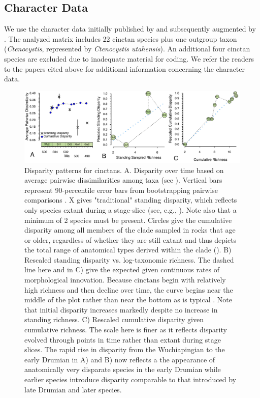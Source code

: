 \documentclass{article}
\begin{document}
\subsection{Character Data}
We use the character data initially published by \citep{SmithZamora2009} and subsequently augmented by \citep{ZamoraRahmanSmith2013}.  The analyzed matrix includes 22 cinctan species plus one outgroup taxon (\textit{Ctenocystis}, represented by \textit{Ctenocystis utahensis}). An additional four cinctan species are excluded due to inadequate material for coding.  We refer the readers to the papers cited above for additional information concerning the character data.
\begin{figure}
  \includegraphics[width=\textwidth]{figures/Cinctan Disparity 3Ways Horizontal.pdf}

  \caption{Disparity patterns for cinctans.  A. Disparity over time based on average pairwise dissimilarities among taxa (see \cite{Foote1992}).  Vertical bars represent 90-percentile error bars from bootstrapping pairwise comparisons \citep{Foote1993}.  X gives "traditional" standing disparity, which reflects only species extant during a stage-slice (see, e.g., \citep{Hughes2013}).  Note also that a minimum of 2 species must be present. Circles give the cumulative disparity among all members of the clade sampled in rocks that age or older, regardless of whether they are still extant and thus depicts the total range of anatomical types derived within the clade (\citep{Wagner2015}).  B) Rescaled standing disparity vs. log-taxonomic richness. The dashed line here and in C) give the expected given continuous rates of morphological innovation.  Because cinctans begin with relatively high richness and then decline over time, the curve begins near the middle of the plot rather than near the bottom as is typical \citep{Jablonski2020}. Note that initial disparity increases markedly despite no increase in standing richness. C) Rescaled cumulative disparity given cumulative richness.  The scale here is finer as it reflects disparity evolved through points in time rather than extant during stage slices. The rapid rise in disparity from the Wuchiapingian to the early Drumian in A) and B) now reflects a the appearance of anatomically very disparate species in the early Drumian while earlier species introduce disparity comparable to that introduced by late Drumian and later species.}
\end{figure}
\end{document}
